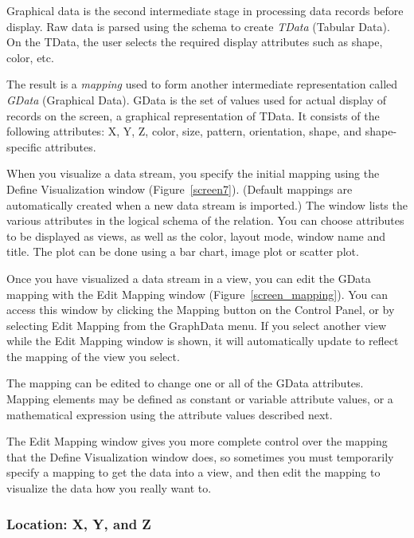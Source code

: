 Graphical data is the second intermediate stage in processing data records
before display. Raw data is parsed using the schema to create {\em TData} (Tabular Data). On
the TData, the user selects the required display attributes such as shape,
color, etc.

The result is a {\em mapping} used to form another intermediate representation
called {\em GData} (Graphical Data). GData is the set of values used for actual
display of records on the screen, a graphical representation of TData. It
consists of the following attributes: X, Y, Z, color, size, pattern,
orientation, shape, and shape-specific attributes.

When you visualize a data stream, you specify the initial mapping using
the Define Visualization window
(Figure~\ref{screen7}). (Default mappings are automatically created when a new
data stream is imported.) The window lists the various attributes in the logical
schema of the relation. You can choose attributes to be displayed as views,
as well as the color, layout mode, window name and title. The plot can be done
using a bar chart, image plot or scatter plot.


Once you have visualized a data stream in a view, you can edit the GData
mapping with the Edit Mapping window (Figure~\ref{screen_mapping}).  You
can access this window by clicking the Mapping button on the Control
Panel, or by selecting Edit Mapping from the GraphData menu.  If you
select another view while the Edit Mapping window is shown, it will
automatically update to reflect the mapping of the view you select.

The mapping can be edited to change one or all of the
GData attributes. Mapping elements may be defined as constant or variable
attribute values, or a mathematical expression using the attribute values
described next.

The Edit Mapping window gives you more complete control over the mapping
that the Define Visualization window does, so sometimes you must temporarily
specify a mapping to get the data into a view, and then edit the mapping
to visualize the data how you really want to.


\subsubsection{Location: X, Y, and Z}

